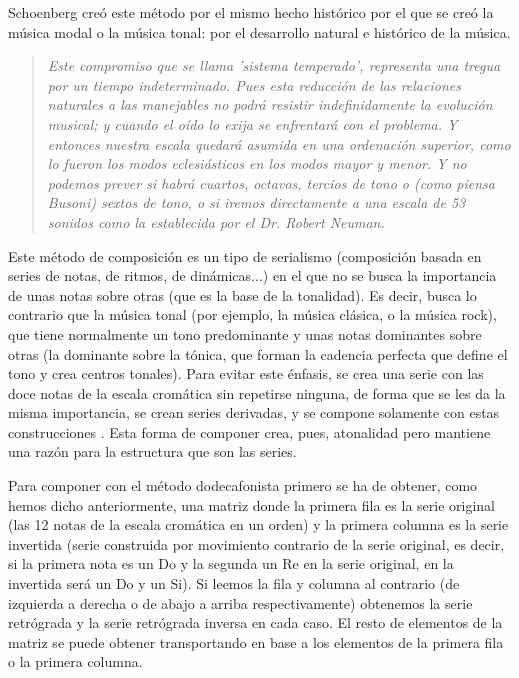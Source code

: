 \documentclass[a4paper,openright,12pt]{book}
\begin{document}

Schoenberg creó este método por el mismo hecho histórico por el que se creó la música modal o la música tonal: por el desarrollo natural e histórico de la música.

\begin{quote}
\em Este compromiso que se llama 'sistema temperado', representa una tregua por un tiempo indeterminado. Pues esta reducción de las relaciones naturales a las manejables no podrá resistir indefinidamente la evolución musical; y cuando el oído lo exija se enfrentará con el problema. Y entonces nuestra escala quedará asumida en una ordenación superior, como lo fueron los modos eclesiásticos en los modos mayor y menor. Y no podemos prever si habrá cuartos, octavos, tercios de tono o (como piensa Busoni) sextos de tono, o si iremos directamente a una escala de 53 sonidos como la establecida por el Dr. Robert Neuman.\cite{tratadodearmonia}
\end{quote}

Este método de composición es un tipo de serialismo (composición basada en series de notas, de ritmos, de dinámicas...) en el que no se busca la importancia de unas notas sobre otras (que es la base de la tonalidad). Es decir, busca lo contrario que la música tonal (por ejemplo, la música clásica, o la música rock), que tiene normalmente un tono predominante y unas notas dominantes sobre otras (la dominante sobre la tónica, que forman la cadencia perfecta que define el tono y crea centros tonales). Para evitar este énfasis, se crea una serie con las doce notas de la escala cromática  sin repetirse ninguna, de forma que se les da la misma importancia, se crean series derivadas, y se compone solamente con estas construcciones \cite{wiki:twelvetonetechnique}. Esta forma de componer crea, pues, atonalidad pero mantiene una razón para la estructura que son las series. 

Para componer con el método dodecafonista primero se ha de obtener, como hemos dicho anteriormente, una matriz donde la primera fila es la serie original (las 12 notas de la escala cromática en un orden) y la primera columna es la serie invertida (serie construida por movimiento contrario de la serie original, es decir, si la primera nota es un Do y la segunda un Re en la serie original, en la invertida será un Do y un Si). Si leemos la fila y columna al contrario (de izquierda a derecha o de abajo a arriba respectivamente) obtenemos la serie retrógrada y la serie retrógrada inversa en cada caso. El resto de elementos de la matriz se puede obtener transportando en base a los elementos de la primera fila o la primera columna.
\end{document}
